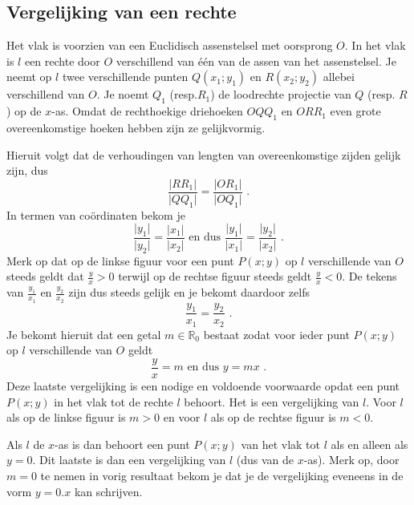 \subsection{Vergelijking van een rechte}


Het vlak is voorzien van een Euclidisch assenstelsel met oorsprong $O$.
In het vlak is $l$ een rechte door $O$ verschillend van \'e\'en van de assen van het assenstelsel.
Je neemt op $l$ twee verschillende punten $Q(x_1;y_1)$ en $R(x_2;y_2)$ allebei verschillend van $O$.
Je noemt $Q_1$ (resp.$R_1$) de loodrechte projectie van $Q$ (resp. $R$) op de $x$-as.
Omdat de rechthoekige driehoeken $OQQ_1$ en $ORR_1$ even grote overeenkomstige hoeken hebben zijn ze gelijkvormig.


Hieruit volgt dat de verhoudingen van lengten van overeenkomstige zijden gelijk zijn, dus
\[
\frac {\vert RR_1 \vert}{\vert QQ_1 \vert}=\frac {\vert OR_1 \vert}{\vert OQ_1 \vert} \text { .}
\]
In termen van co\"ordinaten bekom je
\[
\frac {\vert y_1 \vert}{\vert y_2 \vert}=\frac {\vert x_1 \vert}{\vert x_2 \vert} \text { en dus } \frac {\vert y_1 \vert}{\vert x_1 \vert}=\frac {\vert y_2 \vert}{\vert x_2 \vert} \text { .}
\]
Merk op dat op de linkse figuur voor een punt $P(x;y)$ op $l$ verschillende van $O$ steeds geldt dat $\frac {y}{x}>0$ terwijl op de rechtse figuur steeds geldt $\frac {y}{x}<0$.
De tekens van $\frac {y_1}{x_1}$ en $\frac {y_2}{x_2}$ zijn dus steeds gelijk en je bekomt daardoor zelfs
\[
\frac {y_1}{x_1} = \frac{y_2}{x_2} \text { .}
\]
Je bekomt hieruit dat een getal $m \in \mathbb{R}_0$ bestaat zodat voor ieder punt $P(x;y)$ op $l$ verschillende van $O$ geldt
\[
\frac {y}{x}=m \text { en dus } y=mx \text { .}
\]
Deze laatste vergelijking is een nodige en voldoende voorwaarde opdat een punt $P(x;y)$ in het vlak tot de rechte $l$ behoort.
Het is een vergelijking van $l$.
Voor $l$ als op de linkse figuur is $m>0$ en voor $l$ als op de rechtse figuur is $m<0$.

Als $l$ de $x$-as is dan behoort een punt $P(x;y)$ van het vlak tot $l$ als en alleen als $y=0$.
Dit laatste is dan een vergelijking van $l$ (dus van de $x$-as).
Merk op, door $m=0$ te nemen in vorig resultaat bekom je dat je de vergelijking eveneens in de vorm $y=0.x$ kan schrijven.

